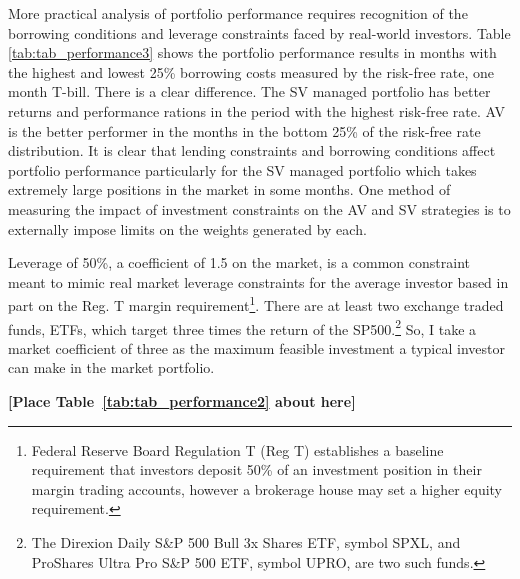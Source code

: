 More practical analysis of portfolio performance requires recognition of the borrowing conditions and leverage constraints faced by real-world investors. Table \ref{tab:tab_performance3} shows the portfolio performance results in months with the highest and lowest 25\% borrowing costs measured by the risk-free rate, one month T-bill. There is a clear difference. The SV managed portfolio has better returns and performance rations in the period with the highest risk-free rate. AV is the better performer in the months in the bottom 25\% of the risk-free rate distribution. It is clear that lending constraints and borrowing conditions affect portfolio performance particularly for the SV managed portfolio which takes extremely large positions in the market in some months. One method of measuring the impact of investment constraints on the AV and SV strategies is to externally impose limits on the weights generated by each.

Leverage of 50\%, a coefficient of 1.5 on the market, is a common constraint meant to mimic real market leverage constraints for the average investor based in part on the Reg. T margin requirement\footnote{Federal Reserve Board Regulation T (Reg T) establishes a baseline requirement that investors deposit 50\% of an investment position in their margin trading accounts, however a brokerage house may set a higher equity requirement.}. \citep{Campbell2008,Rapach2010,Rapach2013,Huang2015,Rapach2016,moreira_volatility-managed_2017,deuskar_margin_2017} There are at least two exchange traded funds, ETFs, which target three times the return of the SP500.\footnote{The Direxion Daily S\&P 500 Bull 3x Shares ETF, symbol SPXL, and ProShares Ultra Pro S\&P 500 ETF, symbol UPRO, are two such funds.} So, I take a market coefficient of three as the maximum feasible investment a typical investor can make in the market portfolio. 
\bigskip
\centerline{\bf [Place Table~\ref{tab:tab_performance2} about here]}
\bigskip

